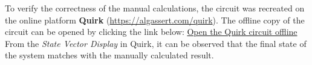 To verify the correctness of the manual calculations, the circuit was recreated on the online platform \textbf{Quirk} (\url{https://algassert.com/quirk}).
The offline copy of the circuit can be opened by clicking the link below:
\href{run:es2.html}{Open the Quirk circuit offline}
From the \textit{State Vector Display} in Quirk, it can be observed that the final state of the system matches with the manually calculated result.
